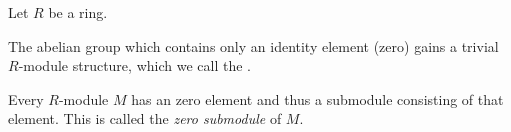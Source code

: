 \documentclass[12pt]{article}
\begin{document}
Let $R$ be a ring.

The abelian group which contains only an identity element (zero) 
gains a trivial $R$-module structure, 
which we call the {}.

Every $R$-module $M$ has an zero element 
and thus a submodule consisting of that element.
This is called the {\it zero submodule} of $M$.
\end{document}

